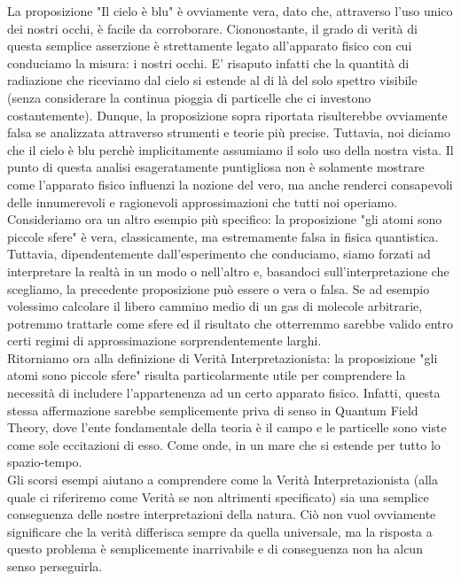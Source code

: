 \documentclass[]{scrbook}
\begin{document}
	La proposizione "Il cielo è blu" è ovviamente vera, dato che, attraverso l'uso unico dei nostri occhi, è facile da corroborare. Ciononostante, il grado di verità di questa semplice asserzione è strettamente legato all'apparato fisico con cui conduciamo la misura: i nostri occhi. E' risaputo infatti che la quantità di radiazione che riceviamo dal cielo si estende al di là del solo spettro visibile (senza considerare la continua pioggia di particelle che ci investono costantemente). Dunque, la proposizione sopra riportata risulterebbe ovviamente falsa se analizzata attraverso strumenti e teorie più precise. Tuttavia, noi diciamo che il cielo è blu perchè implicitamente assumiamo il solo uso della nostra vista. Il punto di questa analisi esageratamente puntigliosa non è solamente mostrare come l'apparato fisico influenzi la nozione del vero, ma anche renderci consapevoli delle innumerevoli e ragionevoli approssimazioni che tutti noi operiamo.\\
	Consideriamo ora un altro esempio più specifico: la proposizione "gli atomi sono piccole sfere" è vera, classicamente, ma estremamente falsa in fisica quantistica. Tuttavia, dipendentemente dall'esperimento che conduciamo, siamo forzati ad interpretare la realtà in un modo o nell'altro e, basandoci sull'interpretazione che scegliamo, la precedente proposizione può essere o vera o falsa. Se ad esempio volessimo calcolare il libero cammino medio di un gas di molecole arbitrarie, potremmo trattarle come sfere ed il risultato che otterremmo sarebbe valido entro certi regimi di approssimazione sorprendentemente larghi.\\
	Ritorniamo ora alla definizione di Verità Interpretazionista: la proposizione "gli atomi sono piccole sfere" risulta particolarmente utile per comprendere la necessità di includere l'appartenenza ad un certo apparato fisico. Infatti, questa stessa affermazione sarebbe semplicemente priva di senso in Quantum Field Theory, dove l'ente fondamentale della teoria è il campo e le particelle sono viste come sole eccitazioni di esso. Come onde, in un mare che si estende per tutto lo spazio-tempo.\\
	Gli scorsi esempi aiutano a comprendere come la Verità Interpretazionista (alla quale ci riferiremo come Verità se non altrimenti specificato) sia una semplice conseguenza delle nostre interpretazioni della natura. Ciò non vuol ovviamente significare che la verità differisca sempre da quella universale, ma la risposta a questo problema è semplicemente inarrivabile e di conseguenza non ha alcun senso perseguirla.\\
\end{document}
